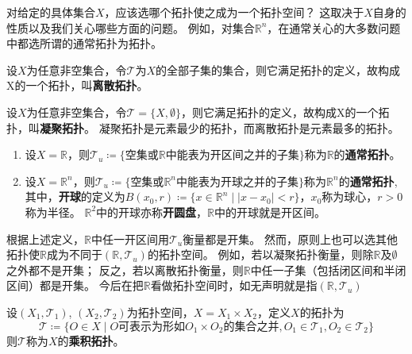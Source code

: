 对给定的具体集合$X$，应该选哪个拓扑使之成为一个拓扑空间？
这取决于$X$自身的性质以及我们关心哪些方面的问题。
例如，对集合$\mathbb{R}^n$，在通常关心的大多数问题中都选所谓的通常拓扑为拓扑。

\begin{example}
	设$X$为任意非空集合，令$\mathscr{T}$为$X$的全部子集的集合，则它满足拓扑的定义，故构成X的一个拓扑，叫\textbf{离散拓扑}。
\end{example}

\begin{example}
	设$X$为任意非空集合，令$\mathscr{T} = \{X, \emptyset\}$，则它满足拓扑的定义，故构成X的一个拓扑，叫\textbf{凝聚拓扑}。
	凝聚拓扑是元素最少的拓扑，而离散拓扑是元素最多的拓扑。
\end{example}

\begin{example}
	\begin{enumerate}[（1）]
		\item 设$X = \mathbb{R}$，则$\mathscr{T}_u \coloneq \{\text{空集或}\mathbb{R}\text{中能表为开区间之并的子集}\}$称为$\mathbb{R}$的\textbf{通常拓扑}。
		\item 设$X = \mathbb{R}^n$，则$\mathscr{T}_u \coloneq \{\text{空集或}\mathbb{R}^n\text{中能表为开球之并的子集}\}$称为$\mathbb{R}^n$的\textbf{通常拓扑},
		      其中，\textbf{开球}的定义为$B(x_0, r) \coloneq \{x \in \mathbb{R}^n \mid |x - x_0| < r\}$，$x_0$称为球心，$r > 0$称为半径。
		      $\mathbb{R}^2$中的开球亦称\textbf{开圆盘}，$\mathbb{R}$中的开球就是开区间。
	\end{enumerate}
\end{example}

根据上述定义，$\mathbb{R}$中任一开区间用$\mathscr{T}_u$衡量都是开集。
然而，原则上也可以选其他拓扑使$\mathbb{R}$成为不同于$(\mathbb{R}, \mathscr{T}_u)$的拓扑空间。
例如，若以凝聚拓扑衡量，则除$\mathbb{R}$及$\emptyset$之外都不是开集；
反之，若以离散拓扑衡量，则$\mathbb{R}$中任一子集（包括闭区间和半闭区间）都是开集。
今后在把$\mathbb{R}$看做拓扑空间时，如无声明就是指$(\mathbb{R}, \mathscr{T}_u)$

\begin{example}
	设$(X_1, \mathscr{T}_1)$, $(X_2, \mathscr{T}_2)$为拓扑空间，$X = X_1 \times X_2$，定义$X$的拓扑为
	$$\mathscr{T} \coloneq \{O \in X \mid O\text{可表示为形如}O_1 \times O_2\text{的集合之并}, O_1 \in \mathscr{T}_1, O_2 \in \mathscr{T}_2\}$$
	则$\mathscr{T}$称为$X$的\textbf{乘积拓扑}。
\end{example}


